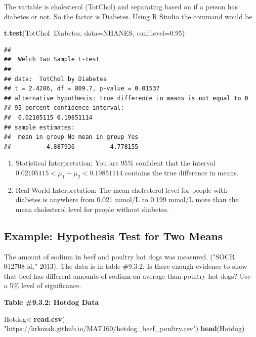 \documentclass[
]{book}
\newenvironment{Shaded}{\begin{snugshade}}{\end{snugshade}}
\newcommand{\DataTypeTok}[1]{\textcolor[rgb]{0.13,0.29,0.53}{#1}}
\newcommand{\FloatTok}[1]{\textcolor[rgb]{0.00,0.00,0.81}{#1}}
\newcommand{\KeywordTok}[1]{\textcolor[rgb]{0.13,0.29,0.53}{\textbf{#1}}}
\newcommand{\NormalTok}[1]{#1}
\newcommand{\OperatorTok}[1]{\textcolor[rgb]{0.81,0.36,0.00}{\textbf{#1}}}
\newcommand{\StringTok}[1]{\textcolor[rgb]{0.31,0.60,0.02}{#1}}
\begin{document}
The variable is cholesterol (TotChol) and separating based on if a person has diabetes or not. So the factor is Diabetes. Using R Studio the command would be

\begin{Shaded}
\begin{Highlighting}[]
\KeywordTok{t.test}\NormalTok{(TotChol}\OperatorTok{~}\NormalTok{Diabetes, }\DataTypeTok{data=}\NormalTok{NHANES, }\DataTypeTok{conf.level=}\FloatTok{0.95}\NormalTok{)}
\end{Highlighting}
\end{Shaded}

\begin{verbatim}
## 
##  Welch Two Sample t-test
## 
## data:  TotChol by Diabetes
## t = 2.4286, df = 809.7, p-value = 0.01537
## alternative hypothesis: true difference in means is not equal to 0
## 95 percent confidence interval:
##  0.02105115 0.19851114
## sample estimates:
##  mean in group No mean in group Yes 
##          4.887936          4.778155
\end{verbatim}

\begin{enumerate}
\def\labelenumi{\arabic{enumi}.}
\setcounter{enumi}{3}
\item
  Statistical Interpretation: You are 95\% confident that the interval \(0.02105115<\mu_1-\mu_2<0.19851114\) contains the true difference in means.
\item
  Real World Interpretation: The mean cholesterol level for people with diabetes is anywhere from 0.021 mmol/L to 0.199 mmol/L more than the mean cholesterol level for people without diabetes.
\end{enumerate}

\hypertarget{example-hypothesis-test-for-two-means-1}{%
\subsection{Example: Hypothesis Test for Two Means}\label{example-hypothesis-test-for-two-means-1}}

The amount of sodium in beef and poultry hot dogs was measured. ("SOCR 012708 id," 2013). The data is in table \#9.3.2. Is there enough evidence to show that beef has different amounts of sodium on average than poultry hot dogs? Use a 5\% level of significance.

\textbf{Table \#9.3.2: Hotdog Data}

\begin{Shaded}
\begin{Highlighting}[]
\NormalTok{Hotdog<-}\KeywordTok{read.csv}\NormalTok{(}
  \StringTok{"https://krkozak.github.io/MAT160/hotdog_beef_poultry.csv"}\NormalTok{)}
\KeywordTok{head}\NormalTok{(Hotdog)}
\end{Highlighting}
\end{Shaded}
\end{document}
